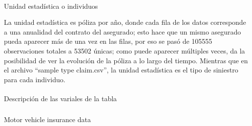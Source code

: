 \documentclass[
  spanish,
  11pt,
  letterpaper,
]{article}
\makeatletter
\let\oldparagraph\paragraph
\renewcommand{\paragraph}{
    \@ifstar
      \xxxParagraphStar
      \xxxParagraphNoStar
  }
\newcommand{\xxxParagraphStar}[1]{\oldparagraph*{#1}\mbox{}}
\newcommand{\xxxParagraphNoStar}[1]{\oldparagraph{#1}\mbox{}}
\let\oldsubparagraph\subparagraph
\renewcommand{\subparagraph}{
    \@ifstar
      \xxxSubParagraphStar
      \xxxSubParagraphNoStar
  }
\newcommand{\xxxSubParagraphStar}[1]{\oldsubparagraph*{#1}\mbox{}}
\newcommand{\xxxSubParagraphNoStar}[1]{\oldsubparagraph{#1}\mbox{}}
\makeatother
\begin{document}
\paragraph{Unidad estadística o
individuos}\label{unidad-estaduxedstica-o-individuos}

La unidad estadística es póliza por año, donde cada fila de los datos
corresponde a una anualidad del contrato del asegurado; esto hace que un
mismo asegurado pueda aparecer más de una vez en las filas, por eso se
pasó de 105555 observaciones totales a 53502 únicas; como puede aparecer
múltiples veces, da la posibilidad de ver la evolución de la póliza a lo
largo del tiempo. Mientras que en el archivo ``sample type claim.csv'',
la unidad estadística es el tipo de siniestro para cada individuo.

\paragraph{Descripción de las variales de la
tabla}\label{descripciuxf3n-de-las-variales-de-la-tabla}

\subparagraph{Motor vehicle insurance
data}\label{motor-vehicle-insurance-data}
\end{document}
